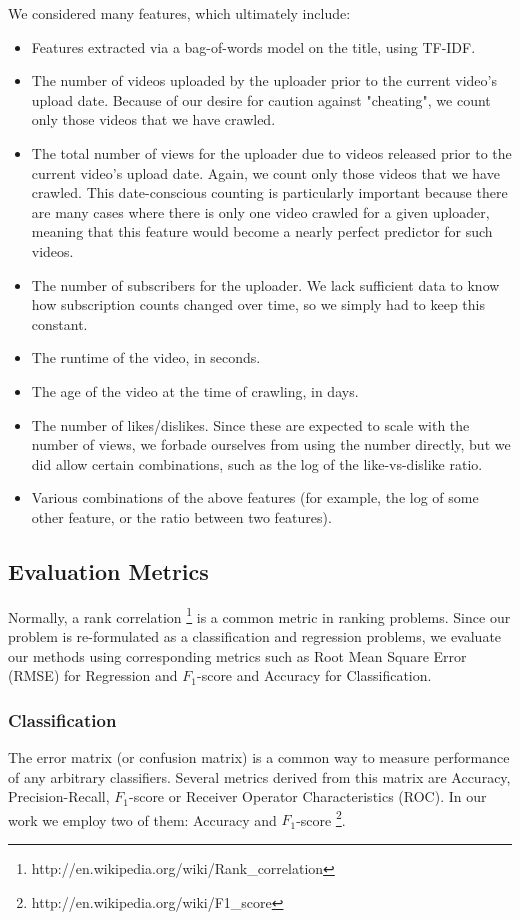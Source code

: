 		We considered many features, which ultimately include:
		\begin{itemize}
			\item
			Features extracted via a bag-of-words model on the title, using TF-IDF.
			\item
			The number of videos uploaded by the uploader prior to the current video's upload date.  Because of our desire for caution against "cheating", we count only those videos that we have crawled.
			\item
			The total number of views for the uploader due to videos released prior to the current video's upload date.  Again, we count only those videos that we have crawled.  This date-conscious counting is particularly important because there are many cases where there is only one video crawled for a given uploader, meaning that this feature would become a nearly perfect predictor for such videos.
			\item
			The number of subscribers for the uploader.  We lack sufficient data to know how subscription counts changed over time, so we simply had to keep this constant.
			\item
			The runtime of the video, in seconds.
			\item
			The age of the video at the time of crawling, in days.
			\item
			The number of likes/dislikes.  Since these are expected to scale with the number of views, we forbade ourselves from using the number directly, but we did allow certain combinations, such as the log of the like-vs-dislike ratio.
			\item
			Various combinations of the above features (for example, the log of some other feature, or the ratio between two features).
		\end{itemize}
	
\subsection{Evaluation Metrics}
	Normally, a rank correlation \footnote{http://en.wikipedia.org/wiki/Rank\_correlation} is a common metric in ranking problems. Since our problem is re-formulated as a classification and regression problems, we evaluate our methods using corresponding metrics such as Root Mean Square Error (RMSE) for Regression and $F_1$-score and Accuracy for Classification.
	
	\subsubsection{Classification}
	The error matrix (or confusion matrix) is a common way to measure performance of any arbitrary classifiers. Several metrics derived from this matrix are Accuracy, Precision-Recall, $F_1$-score or Receiver Operator Characteristics (ROC). In our work we employ two of them: Accuracy and $F_1$-score \footnote{http://en.wikipedia.org/wiki/F1\_score}.
	
